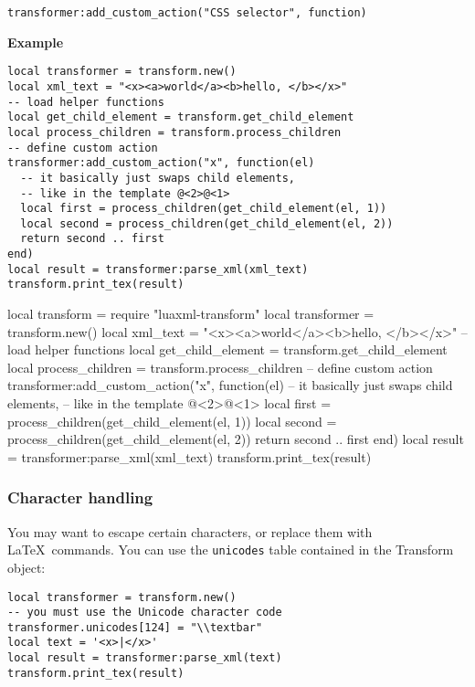 \documentclass{ltxdoc}
\begin{document}
\begin{verbatim}
transformer:add_custom_action("CSS selector", function)
\end{verbatim}


\noindent\textbf{Example}
\begin{verbatim}
local transformer = transform.new()
local xml_text = "<x><a>world</a><b>hello, </b></x>"
-- load helper functions
local get_child_element = transform.get_child_element
local process_children = transform.process_children
-- define custom action
transformer:add_custom_action("x", function(el)
  -- it basically just swaps child elements, 
  -- like in the template @<2>@<1>
  local first = process_children(get_child_element(el, 1))
  local second = process_children(get_child_element(el, 2))
  return second .. first
end)
local result = transformer:parse_xml(xml_text)
transform.print_tex(result)
\end{verbatim}

\begin{framed}
\begin{luacode*}

local transform = require "luaxml-transform"
local transformer = transform.new()
local xml_text = "<x><a>world</a><b>hello, </b></x>"
-- load helper functions
local get_child_element = transform.get_child_element
local process_children = transform.process_children
-- define custom action
transformer:add_custom_action("x", function(el)
  -- it basically just swaps child elements, 
  -- like in the template @<2>@<1>
  local first = process_children(get_child_element(el, 1))
  local second = process_children(get_child_element(el, 2))
  return second .. first
end)
local result = transformer:parse_xml(xml_text)
transform.print_tex(result)
\end{luacode*}
\end{framed}

\subsubsection{Character handling}

You may want to escape certain characters, or replace them with
\LaTeX\ commands. You can use the \texttt{unicodes} table contained 
in the Transform object:


\begin{verbatim}
local transformer = transform.new()
-- you must use the Unicode character code
transformer.unicodes[124] = "\\textbar"
local text = '<x>|</x>'
local result = transformer:parse_xml(text)
transform.print_tex(result)
\end{verbatim}
\end{document}
